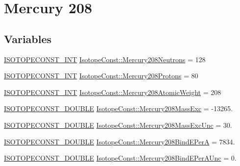 \hypertarget{group___isotope_const-_mercury-_hg208}{}\section{Mercury 208}
\label{group___isotope_const-_mercury-_hg208}
\subsection*{Variables}
\begin{DoxyCompactItemize}
\item 
\mbox{\hyperlink{group___isotope_const-_macros_ga5f18360b3e99483a35c32d789e62621c}{I\+S\+O\+T\+O\+P\+E\+C\+O\+N\+S\+T\+\_\+\+I\+NT}} \mbox{\hyperlink{group___isotope_const-_mercury-_hg208_gad399e71c721915fcb995ebe1b272ce3b}{Isotope\+Const\+::\+Mercury208\+Neutrons}} = 128
\item 
\mbox{\hyperlink{group___isotope_const-_macros_ga5f18360b3e99483a35c32d789e62621c}{I\+S\+O\+T\+O\+P\+E\+C\+O\+N\+S\+T\+\_\+\+I\+NT}} \mbox{\hyperlink{group___isotope_const-_mercury-_hg208_ga738c42b9169e7789e5aefaf1280cc07f}{Isotope\+Const\+::\+Mercury208\+Protons}} = 80
\item 
\mbox{\hyperlink{group___isotope_const-_macros_ga5f18360b3e99483a35c32d789e62621c}{I\+S\+O\+T\+O\+P\+E\+C\+O\+N\+S\+T\+\_\+\+I\+NT}} \mbox{\hyperlink{group___isotope_const-_mercury-_hg208_gab5b14dbcb23d0836d9934167d81843b8}{Isotope\+Const\+::\+Mercury208\+Atomic\+Weight}} = 208
\item 
\mbox{\hyperlink{group___isotope_const-_macros_ga8f45a7272ce02c0b4c65c44636ed719a}{I\+S\+O\+T\+O\+P\+E\+C\+O\+N\+S\+T\+\_\+\+D\+O\+U\+B\+LE}} \mbox{\hyperlink{group___isotope_const-_mercury-_hg208_ga51eae42342ce9078502049a9a709d53a}{Isotope\+Const\+::\+Mercury208\+Mass\+Exc}} = -\/13265.
\item 
\mbox{\hyperlink{group___isotope_const-_macros_ga8f45a7272ce02c0b4c65c44636ed719a}{I\+S\+O\+T\+O\+P\+E\+C\+O\+N\+S\+T\+\_\+\+D\+O\+U\+B\+LE}} \mbox{\hyperlink{group___isotope_const-_mercury-_hg208_ga78186221b74686cdb8c3caa7a327e9c5}{Isotope\+Const\+::\+Mercury208\+Mass\+Exc\+Unc}} = 30.
\item 
\mbox{\hyperlink{group___isotope_const-_macros_ga8f45a7272ce02c0b4c65c44636ed719a}{I\+S\+O\+T\+O\+P\+E\+C\+O\+N\+S\+T\+\_\+\+D\+O\+U\+B\+LE}} \mbox{\hyperlink{group___isotope_const-_mercury-_hg208_ga5d8bf7f1700ebe780c9085f1fe4759fa}{Isotope\+Const\+::\+Mercury208\+Bind\+E\+PerA}} = 7834.
\item 
\mbox{\hyperlink{group___isotope_const-_macros_ga8f45a7272ce02c0b4c65c44636ed719a}{I\+S\+O\+T\+O\+P\+E\+C\+O\+N\+S\+T\+\_\+\+D\+O\+U\+B\+LE}} \mbox{\hyperlink{group___isotope_const-_mercury-_hg208_ga69f025d98072827e9f3758840999c94f}{Isotope\+Const\+::\+Mercury208\+Bind\+E\+Per\+A\+Unc}} = 0.

\end{DoxyCompactItemize}
